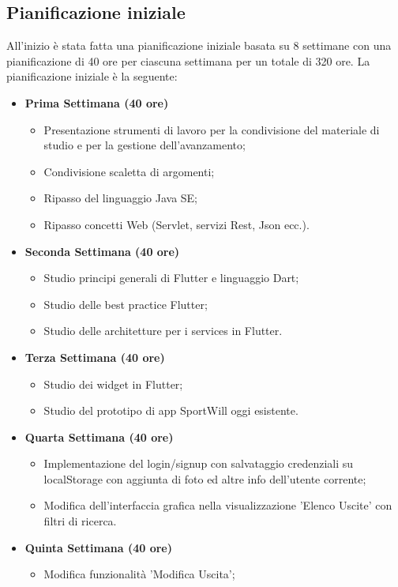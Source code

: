 \subsection{Pianificazione iniziale}
All'inizio è stata fatta una pianificazione iniziale basata su 8 settimane con una pianificazione di 40 ore per ciascuna settimana per un totale di 320 ore.
La pianificazione iniziale è la seguente:
 \begin{itemize}
	\item \textbf{Prima Settimana (40 ore)}
	\begin{itemize}
		\item Presentazione strumenti di lavoro per la condivisione del materiale di studio e per la gestione
		dell’avanzamento;
		\item Condivisione scaletta di argomenti;
		\item Ripasso del linguaggio Java SE;
		\item Ripasso concetti Web (Servlet, servizi Rest, Json ecc.).
	\end{itemize}
	\item \textbf{Seconda Settimana (40 ore)} 
	\begin{itemize}
		\item Studio principi generali di Flutter e linguaggio Dart;
		\item Studio delle best practice Flutter;
		\item Studio delle architetture per i services in Flutter.
	\end{itemize}
	\item \textbf{Terza Settimana (40 ore)} 
	\begin{itemize}
		\item Studio dei widget in Flutter;
		\item Studio del prototipo di app SportWill oggi esistente.
	\end{itemize}
	\item \textbf{Quarta Settimana (40 ore)} 
	\begin{itemize}
		\item Implementazione del login/signup con salvataggio credenziali su localStorage con aggiunta di foto ed altre info dell'utente corrente;
		\item Modifica dell'interfaccia grafica nella visualizzazione 'Elenco Uscite' con filtri di ricerca.
	\end{itemize}
	\item \textbf{Quinta Settimana (40 ore)} 
	\begin{itemize}
		\item Modifica funzionalità 'Modifica Uscita';

\end{itemize}
\end{itemize}
